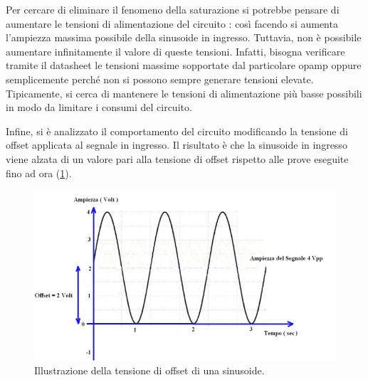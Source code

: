 \noindent
Per cercare di eliminare il fenomeno della saturazione si potrebbe pensare di aumentare le tensioni di alimentazione del circuito
: così facendo si aumenta l'ampiezza massima possibile della sinusoide in ingresso. Tuttavia, non è possibile aumentare infinitamente il valore di queste tensioni. Infatti, bisogna verificare tramite il datasheet le tensioni massime sopportate dal particolare opamp oppure semplicemente perché non si possono sempre generare tensioni elevate. Tipicamente, si cerca di mantenere le tensioni di alimentazione più basse possibili in modo da limitare i consumi del circuito.


Infine, si è analizzato il comportamento del circuito modificando la tensione di offset applicata al segnale in ingresso. Il risultato è che la sinusoide in ingresso viene alzata di un valore pari alla tensione di offset rispetto alle prove eseguite fino ad ora (\Fig\ref{fig:misure_oscilloscopio_offset_sinusoide}).
\begin{figure}[h!]
	\centering
	\includegraphics[width=0.6\linewidth]{./ImageFiles/Laboratorio 1/tensione offset}
	\caption{Illustrazione della tensione di offset di una sinusoide.}
	\label{fig:misure_oscilloscopio_offset_sinusoide}
\end{figure} 


